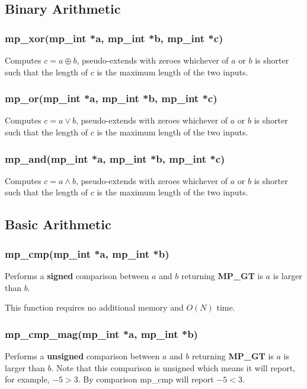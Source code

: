 \documentclass{article}
\begin{document}
\subsection{Binary Arithmetic}
\subsubsection{mp\_xor(mp\_int *a, mp\_int *b, mp\_int *c)}
Computes $c = a \oplus b$, pseudo-extends with zeroes whichever of $a$ or $b$ is shorter such that the length
of $c$ is the maximum length of the two inputs.

\subsubsection{mp\_or(mp\_int *a, mp\_int *b, mp\_int *c)}
Computes $c = a \lor b$, pseudo-extends with zeroes whichever of $a$ or $b$ is shorter such that the length
of $c$ is the maximum length of the two inputs.

\subsubsection{mp\_and(mp\_int *a, mp\_int *b, mp\_int *c)}
Computes $c = a \land b$, pseudo-extends with zeroes whichever of $a$ or $b$ is shorter such that the length
of $c$ is the maximum length of the two inputs.

\subsection{Basic Arithmetic}

\subsubsection{mp\_cmp(mp\_int *a, mp\_int *b)}
Performs a \textbf{signed} comparison between $a$ and $b$ returning \textbf{MP\_GT} is $a$ is larger than $b$.

This function requires no additional memory and $O(N)$ time.

\subsubsection{mp\_cmp\_mag(mp\_int *a, mp\_int *b)}
Performs a \textbf{unsigned} comparison between $a$ and $b$ returning \textbf{MP\_GT} is $a$ is larger than $b$.  Note 
that this comparison is unsigned which means it will report, for example, $-5 > 3$.  By comparison mp\_cmp will 
report $-5 < 3$.
\end{document}
